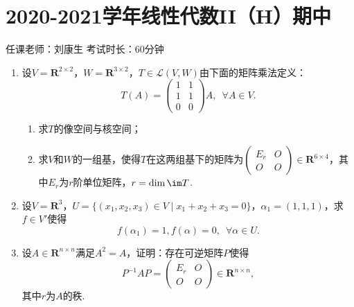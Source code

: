\section{2020-2021学年线性代数II（H）期中}

\begin{center}
    任课老师：刘康生\hspace{4em} 考试时长：60分钟
\end{center}

\begin{enumerate}
    \item 设$V=\mathbf{R}^{2\times 2}$，$W=\mathbf{R}^{3\times 2}$，$T\in\mathcal{L}(V,W)$由下面的矩阵乘法定义：
    \[T(A)=\begin{pmatrix}
        1 & 1 \\ 1 & 1 \\ 0 & 0
    \end{pmatrix}A,\enspace \forall A\in V.\]
    \begin{enumerate}
        \item 求$T$的像空间与核空间；

        \item 求$V$和$W$的一组基，使得$T$在这两组基下的矩阵为$\begin{pmatrix}
            E_r & O \\ O & O
        \end{pmatrix}\in\mathbf{R}^{6\times 4}$，其中$E_r$为$r$阶单位矩阵，$r=\dim\im T$.
    \end{enumerate}

    \item 设$V=\mathbf{R}^3$，$U=\{(x_1,x_2,x_3)\in V\mid x_1+x_2+x_3=0\}$，$\alpha_1=(1,1,1)$，求$f\in V'$使得
    \[f(\alpha_1)=1,f(\alpha)=0,\enspace \forall\alpha\in U.\]

    \item 设$A\in\mathbf{R}^{n\times n}$满足$A^2=A$，证明：存在可逆矩阵$P$使得
    \[P^{-1}AP=\begin{pmatrix}
        E_r & O \\ O & O
    \end{pmatrix}\in\mathbf{R}^{n\times n},\]
    其中$r$为$A$的秩.
\end{enumerate}

\clearpage
